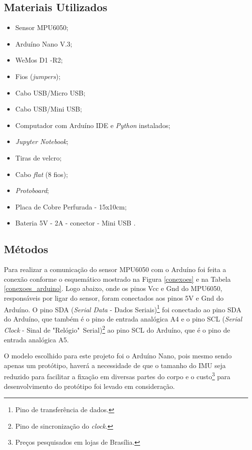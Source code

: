 	\subsection{Materiais Utilizados}
		\begin{itemize}
			
			\item Sensor MPU6050;
			\item Arduíno Nano V.3;
			\item WeMos D1 -R2;
			\item Fios (\textit{jumpers});
			\item Cabo USB/Micro USB;
			\item Cabo USB/Mini USB;
			\item Computador com Arduíno IDE e \textit{Python} instalados;
			\item \textit{Jupyter Notebook};
			\item Tiras de velcro;
			\item Cabo \textit{flat} (8 fios);
			\item \textit{Protoboard};
			\item Placa de Cobre  Perfurada - 15x10cm;
			\item Bateria 5V - 2A -  conector - Mini USB .
		\end{itemize}	
	 
	\subsection{Métodos}
		
		Para realizar a comunicação do sensor MPU6050 com o Arduíno foi feita a conexão conforme o esquemático mostrado na Figura \ref{conexoes} e na Tabela \ref{conexoes_arduino}. Logo abaixo, onde os pinos Vcc e Gnd do MPU6050, responsáveis por ligar do sensor, foram conectados aos pinos 5V e Gnd do Arduíno. O pino SDA (\textit{Serial Data} - Dados Seriais)\footnote{Pino de transferência de dados.} foi conectado ao pino SDA do Arduíno, que também é o pino de entrada analógica A4 e o pino SCL (\textit{Serial Clock} - Sinal de "Relógio"\ Serial)\footnote{Pino de sincronização do \textit{clock}.} ao pino SCL do Arduíno, que é o pino de entrada analógica A5.  
		
		O  modelo escolhido para este projeto foi o Arduíno Nano, pois mesmo sendo apenas um protótipo, haverá a necessidade de que o tamanho do IMU seja reduzido para facilitar a fixação em diversas partes do corpo e o custo\footnote{Preços pesquisados em lojas de Brasília.} para desenvolvimento do protótipo foi levado em consideração.
		
